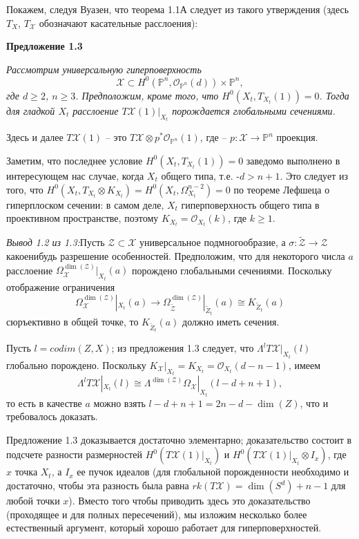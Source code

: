 Покажем, следуя Вуазен, что теорема 1.1А следует из такого утверждения
(здесь $T_X$, $T_\mathcal{X}$ обозначают касательные расслоения):

\medskip
{\bf Предложение 1.3}
	\begin{theorem}
		{\it
			Рассмотрим универсальную гиперповерхность
		}
		$$
		\mathcal{X}\subset H^0(\mathbb{P}^n, \mathcal{O}_{\mathbb{P}^n}(d))\times {\mathbb{P}^n},
		$$
		{\it
			где $d\geq 2$, $n\geq 3$. Предположим, кроме того, что $H^0(X_t, T_{X_t}(1))=0$.
			Тогда для гладкой $X_t$ расслоение $T\mathcal{X}(1)|_{X_t}$ порождается
			глобальными сечениями.
		}
	\end{theorem}

\medskip
Здесь и далее $T\mathcal{X}(1)$ -- это $T\mathcal{X}\otimes p^*\mathcal{O}_{\mathbb{P}^n}(1)$,
где -- $p\colon\mathcal{X}\to \mathbb{P}^n$ проекция.


Заметим, что последнее условие $H^0(X_t, T_{X_t}(1))=0$ заведомо выполнено в
интересующем нас случае, когда $X_t$ общего типа, т.е. -$d>n+1$. Это следует
из того, что $H^0(X_t, T_{X_t}\otimes K_{X_t})=H^0(X_t, \Omega^{n-2}_{X_t})=0$
по теореме Лефшеца о гиперплоском сечении: в самом деле, $X_t$ гиперповерхность
общего типа в проективном пространстве, поэтому $K_{X_t}=\mathcal{O}_{X_t}(k)$,
где $k\geq 1$.


\medskip
\textit{Вывод \textup{1.2} из \textup{1.3:}}
Пусть $\mathcal{Z}\subset \mathcal{X}$ универсальное подмногообразие, а
$\sigma\colon\tilde{\mathcal{Z}}\rightarrow \mathcal{Z}$ какоенибудь разрешение
особенностей. Предположим, что для некоторого числа $a$ расслоение
$\Omega^{\dim(\mathcal{Z})}_\mathcal{X}|_{X_t}(a)$ порождено глобальными
сечениями. Поскольку отображение ограничения
$$
\Omega^{\dim(\mathcal{Z})}_\mathcal{X}|_{X_t}(a)\rightarrow
\Omega^{\dim(\mathcal{Z})}_{\tilde{\mathcal{Z}}}|_{\tilde{Z}_t}(a)\cong K_{\tilde{Z}_t}(a)
$$
сюръективно в общей точке, то $K_{\tilde{Z}_t}(a)$ должно иметь сечения.

Пусть $l=codim(Z,X)$; из предложения 1.3 следует, что $\Lambda^lT\mathcal{X}|_{X_t}(l)$
глобально порождено. Поскольку $K_\mathcal{X}|_{X_t}=K_{X_t}=
\mathcal{O}_{X_t}(d-n-1)$, имеем
$$
\Lambda^lT\mathcal{X}|_{X_t}(l)\cong
\Lambda^{\dim(\mathcal{Z})}\Omega_\mathcal{X}|_{X_t}(l-d+n+1),
$$
то есть в качестве $a$ можно взять $l-d+n+1=2n-d-\dim(Z)$, что и требовалось
доказать.


\medskip
Предложение 1.3 доказывается достаточно элементарно; доказательство
состоит в подсчете разности размерностей $H^0(T\mathcal{X}(1)|_{X_t})$ и
$H^0(T\mathcal{X}(1)|_{X_t}\otimes I_x)$, где $x$ точка $X_t$, а $I_x$
ее пучок идеалов (для глобальной порожденности необходимо и достаточно,
чтобы эта разность
была равна $rk(T\mathcal{X})=\dim(S^d)+n-1$ для любой точки $x$). Вместо того
чтобы приводить здесь это доказательство (проходящее и для полных
пересечений), мы изложим несколько более естественный аргумент,
который хорошо работает для гиперповерхностей.


